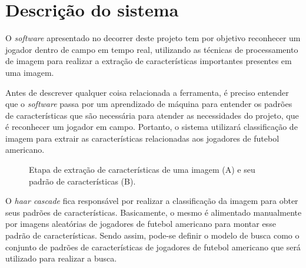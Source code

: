 \section{\textbf{Descrição do sistema}}
\label{descricao-do-sistema}


O \textit{software} apresentado no decorrer deste projeto tem por objetivo reconhecer um jogador dentro de campo em tempo real, utilizando as técnicas de processamento de imagem para realizar a extração de características importantes presentes em uma imagem.

Antes de descrever qualquer coisa relacionada a ferramenta, é preciso entender que o \textit{software} passa por um aprendizado de máquina para entender os padrões de características que são necessária para atender as necessidades do projeto, que é reconhecer um jogador em campo. Portanto, o sistema utilizará classificação de imagem para extrair as características relacionadas aos jogadores de futebol americano.

\begin{figure}[h]
	\caption{\label{fig_conversao_img}Etapa de extração de características de uma imagem (A) e seu padrão de características (B).}
	\begin{center}
	\end{center}
	\centering {}
\end{figure}

O \textit{haar cascade} fica responsável por realizar a classificação da imagem para obter seus padrões de características. Basicamente, o mesmo é alimentado manualmente por imagens aleatórias de jogadores de futebol americano para montar esse padrão de características. Sendo assim, pode-se definir o modelo de busca como o conjunto de padrões de características de jogadores de futebol americano que será utilizado para realizar a busca.

